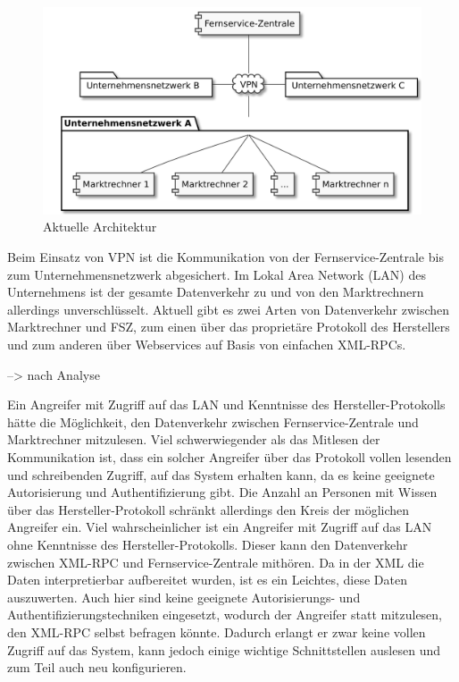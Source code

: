\documentclass[11pt,a4paper]{report}
\begin{document}
\begin{figure}[htbp]
\centering
\includegraphics[scale=0.2]{images/problemfeld.pdf}
\caption{Aktuelle Architektur}
\label{fig:current_setup}
\end{figure}

Beim Einsatz von VPN ist die Kommunikation von der Fernservice-Zentrale bis zum Unternehmensnetzwerk abgesichert. Im Lokal Area Network (LAN) des Unternehmens ist der gesamte Datenverkehr zu und von den Marktrechnern allerdings unverschlüsselt. Aktuell gibt es zwei Arten von Datenverkehr zwischen Marktrechner und FSZ, zum einen über das proprietäre Protokoll des Herstellers und zum anderen über Webservices auf Basis von einfachen XML-RPCs.

--> nach Analyse

Ein Angreifer mit Zugriff auf das LAN und Kenntnisse des Hersteller-Protokolls hätte die Möglichkeit, den Datenverkehr zwischen Fernservice-Zentrale und Marktrechner mitzulesen. Viel schwerwiegender als das Mitlesen der Kommunikation ist, dass ein solcher Angreifer über das Protokoll vollen lesenden und schreibenden Zugriff, auf das System erhalten kann, da es keine geeignete Autorisierung und Authentifizierung gibt. Die Anzahl an Personen mit Wissen über das Hersteller-Protokoll schränkt allerdings den Kreis der möglichen Angreifer ein. Viel wahrscheinlicher ist ein Angreifer mit Zugriff auf das LAN ohne Kenntnisse des Hersteller-Protokolls. Dieser kann den Datenverkehr zwischen XML-RPC und Fernservice-Zentrale mithören. Da in der XML die Daten interpretierbar aufbereitet wurden, ist es ein Leichtes, diese Daten auszuwerten. Auch hier sind keine geeignete Autorisierungs- und Authentifizierungstechniken eingesetzt, wodurch der Angreifer statt mitzulesen, den XML-RPC selbst befragen könnte. Dadurch erlangt er zwar keine vollen Zugriff auf das System, kann jedoch einige wichtige Schnittstellen auslesen und zum Teil auch neu konfigurieren. 
\end{document}
